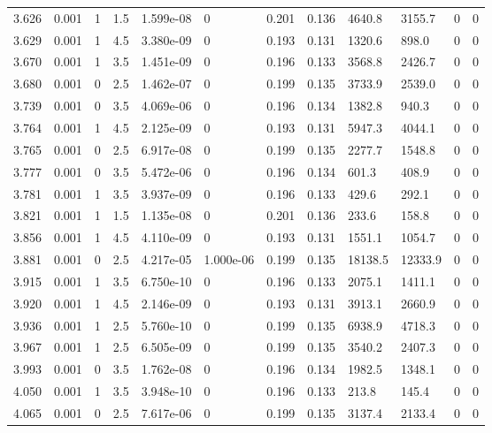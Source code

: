 \documentclass[preview]{standalone}
\begin{document}
{{{{\begin{tabular}{L{1.2cm}C{1.2cm} C{0.3cm}C{0.5cm} C{1.4cm}C{1.4cm} C{1.4cm}C{1.4cm} C{1.6cm}C{1.6cm} C{1.6cm}C{1.6cm}}
  3.626  &  0.001  & 1     & 1.5 &  1.599e-08  & 0  &  0.201&   0.136& 4640.8 & 3155.7   &  0 & 0  \\ 
  3.629  &  0.001  & 1     & 4.5 &  3.380e-09  & 0  &  0.193&   0.131& 1320.6 & 898.0   &  0 & 0  \\ 
  3.670  &  0.001  & 1     & 3.5 &  1.451e-09  & 0  &  0.196&   0.133& 3568.8 & 2426.7   &  0 & 0  \\ 
  3.680  &  0.001  & 0     & 2.5 &  1.462e-07  & 0  &  0.199&   0.135& 3733.9 & 2539.0   &  0 & 0  \\ 
  3.739  &  0.001  & 0     & 3.5 &  4.069e-06  & 0  &  0.196&   0.134& 1382.8 & 940.3   &  0 & 0  \\ 
  3.764  &  0.001  & 1     & 4.5 &  2.125e-09  & 0  &  0.193&   0.131& 5947.3 & 4044.1   &  0 & 0  \\ 
  3.765  &  0.001  & 0     & 2.5 &  6.917e-08  & 0  &  0.199&   0.135& 2277.7 & 1548.8   &  0 & 0  \\ 
  3.777  &  0.001  & 0     & 3.5 &  5.472e-06  & 0  &  0.196&   0.134& 601.3 & 408.9   &  0 & 0  \\ 
  3.781  &  0.001  & 1     & 3.5 &  3.937e-09  & 0  &  0.196&   0.133& 429.6 & 292.1   &  0 & 0  \\ 
  3.821  &  0.001  & 1     & 1.5 &  1.135e-08  & 0  &  0.201&   0.136& 233.6 & 158.8   &  0 & 0  \\ 
  3.856  &  0.001  & 1     & 4.5 &  4.110e-09  & 0  &  0.193&   0.131& 1551.1 & 1054.7   &  0 & 0  \\ 
  3.881  &  0.001  & 0     & 2.5 &  4.217e-05  & 1.000e-06  &  0.199&   0.135& 18138.5 & 12333.9   &  0 & 0  \\ 
  3.915  &  0.001  & 1     & 3.5 &  6.750e-10  & 0  &  0.196&   0.133& 2075.1 & 1411.1   &  0 & 0  \\ 
  3.920  &  0.001  & 1     & 4.5 &  2.146e-09  & 0  &  0.193&   0.131& 3913.1 & 2660.9   &  0 & 0  \\ 
  3.936  &  0.001  & 1     & 2.5 &  5.760e-10  & 0  &  0.199&   0.135& 6938.9 & 4718.3   &  0 & 0  \\ 
  3.967  &  0.001  & 1     & 2.5 &  6.505e-09  & 0  &  0.199&   0.135& 3540.2 & 2407.3   &  0 & 0  \\ 
  3.993  &  0.001  & 0     & 3.5 &  1.762e-08  & 0  &  0.196&   0.134& 1982.5 & 1348.1   &  0 & 0  \\ 
  4.050  &  0.001  & 1     & 3.5 &  3.948e-10  & 0  &  0.196&   0.133& 213.8 & 145.4   &  0 & 0  \\ 
  4.065  &  0.001  & 0     & 2.5 &  7.617e-06  & 0  &  0.199&   0.135& 3137.4 & 2133.4   &  0 & 0  \\ 

\end{tabular}}}}}
\end{document}
